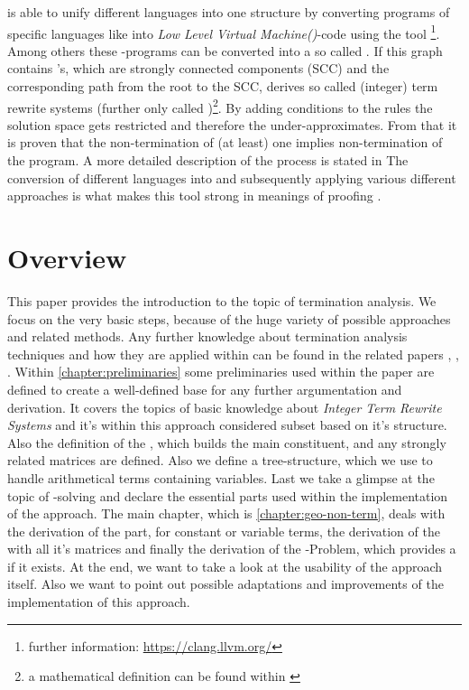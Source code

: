 \aprove is able to unify different languages into one structure by converting programs of specific languages like  into \textit{Low Level Virtual Machine(\llvm)}-code using the tool  \footnote{further information: \url{https://clang.llvm.org/}}. Among others these \llvm-programs can be converted into a so called \seg. If this graph contains \lasso's, which are strongly connected components (SCC) and the corresponding path from the root to the SCC, \aprove derives so called (integer) term rewrite systems (further only called \its)\footnote{a mathematical definition can be found within \cite{fuhs2009proving}}. By adding conditions to the \its rules the solution space gets restricted and therefore the \its under-approximates. From that it is proven that the non-termination of (at least) one \its implies non-termination of the program. A more detailed description of the process is stated in \cite{hensel2017aprove} \newline
The conversion of different languages into \its and subsequently applying various different approaches is what makes this tool strong in meanings of proofing \cite{giesl2017analyzing}.

\section{Overview}
\label{sec:overview}
This paper provides the introduction to the topic of termination analysis. We focus on the very basic steps, because of the huge variety of possible approaches and related methods. Any further knowledge about termination analysis techniques and how they are applied within \aprove can be found in the related papers \cite{giesl2017analyzing}, \cite{giesl2006aprove}, \cite{giesl2003aprove}.\newline
Within \autoref{chapter:preliminaries} some preliminaries used within the paper are defined to create a well-defined base for any further argumentation and derivation. It covers the topics of basic knowledge about \textit{Integer Term Rewrite Systems} and it's within this approach considered subset based on it's structure. Also the definition of the \gna, which builds the main constituent, and any strongly related matrices are defined. Also we define a tree-structure, which we use to handle arithmetical terms containing variables. Last we take a glimpse at the topic of -solving and declare the essential parts used within the implementation of the approach.\newline
The main chapter, which is \autoref{chapter:geo-non-term}, deals with the derivation of the \stem part, for constant or variable terms, the derivation of the \loopt with all it's matrices and finally the derivation of the -Problem, which provides a \gna if it exists. \newline
At the end, we want to take a look at the usability of the approach itself. Also we want to point out possible adaptations and improvements of the implementation of this approach.